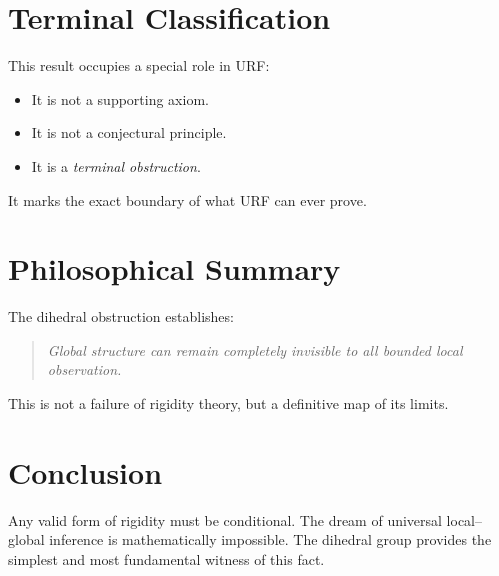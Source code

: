 \documentclass[11pt]{article}
\begin{document}
\section{Terminal Classification}

This result occupies a special role in URF:

\begin{itemize}
\item It is not a supporting axiom.
\item It is not a conjectural principle.
\item It is a \emph{terminal obstruction}.
\end{itemize}

It marks the exact boundary of what URF can ever prove.

\section{Philosophical Summary}

The dihedral obstruction establishes:

\begin{quote}
\emph{Global structure can remain completely invisible to all bounded local observation.}
\end{quote}

This is not a failure of rigidity theory, but a definitive map of its limits.

\section*{Conclusion}

Any valid form of rigidity must be conditional.
The dream of universal local--global inference is mathematically impossible.
The dihedral group provides the simplest and most fundamental witness of this fact.
\end{document}
